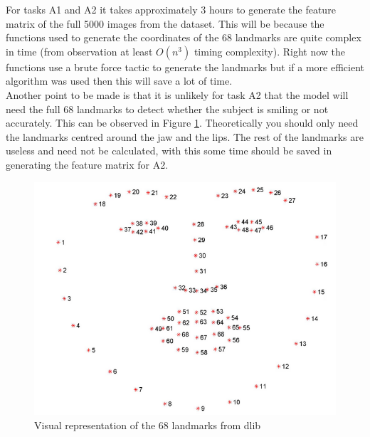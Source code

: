 \documentclass{article}
\begin{document}
     For tasks A1 and A2 it takes approximately 3 hours to generate the feature matrix of the full 5000 images from the dataset. This will be because the functions used to generate the coordinates of the 68 landmarks are quite complex in time (from observation at least $O(n^3)$ timing complexity). Right now the functions use a brute force tactic to generate the landmarks but if a more efficient algorithm was used then this will save a lot of time.\\
     
     Another point to be made is that it is unlikely for task A2 that the model will need the full 68 landmarks to detect whether the subject is smiling or not accurately. This can be observed in Figure \ref{fig:landmarks}. Theoretically you should only need the landmarks centred around the jaw and the lips. The rest of the landmarks are useless and need not be calculated, with this some time should be saved in generating the feature matrix for A2.\\
     \begin{figure}[htb]
     	\centering
     	\includegraphics[scale=0.4]{Figures/landmarks.PNG}
     	\caption{Visual representation of the 68 landmarks from dlib}
     	\label{fig:landmarks}
     \end{figure}
 
\end{document}
